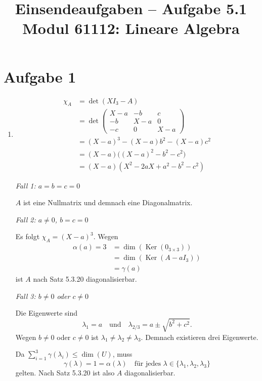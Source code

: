 \documentclass[a4paper,12pt]{article}
\title{Einsendeaufgaben -- Aufgabe 5.1\\[0.5em]
\large Modul 61112: Lineare Algebra}
\author{}
\date{}
\begin{document}
\maketitle

\section*{Aufgabe 1}

\begin{enumerate}[label=\alph*)]

    \item
    \begin{align*}
        \chi_A &= \det(XI_3 - A) \\
               &= \det\begin{pmatrix}
                    X-a & -b  & c \\
                    -b  & X-a & 0 \\
                    -c  & 0   & X-a
                  \end{pmatrix} \\
               &= (X-a)^3 - (X-a)b^2 - (X-a)c^2 \\
               &= (X-a)\bigl((X-a)^2 - b^2 - c^2\bigr) \\
               &= (X-a)(X^2 - 2aX + a^2 - b^2 - c^2)
    \end{align*}

    \textit{Fall 1: $a = b = c = 0$}

    $A$ ist eine Nullmatrix und demnach eine Diagonalmatrix.

    \textit{Fall 2: $a \neq 0$, $b = c = 0$}

    Es folgt $\chi_A = (X-a)^3$. Wegen
    \begin{align*}
        \alpha(a) = 3 &= \dim(\operatorname{Ker}(0_{3\times 3})) \\
                 &= \dim(\operatorname{Ker}(A - aI_3)) \\
                 &= \gamma(a)
    \end{align*}
    ist $A$ nach Satz 5.3.20 diagonalisierbar.

    \textit{Fall 3: $b \neq 0$ oder $c \neq 0$}

    Die Eigenwerte sind
    \[
        \lambda_1 = a \quad\text{und}\quad \lambda_{2/3} = a \pm \sqrt{b^2 + c^2}.
    \]
    Wegen $b \neq 0$ oder $c \neq 0$ ist $\lambda_1 \neq \lambda_2 \neq \lambda_3$.
    Demnach existieren drei Eigenwerte.

    Da $\sum_{i=1}^{3} \gamma(\lambda_i) \leq \dim(U)$, muss
    \[
        \gamma(\lambda) = 1 = \alpha(\lambda) \quad\text{für jedes } \lambda \in \{\lambda_1, \lambda_2, \lambda_3\}
    \]
    gelten. Nach Satz 5.3.20 ist also $A$ diagonalisierbar.


\end{enumerate}
\end{document}
